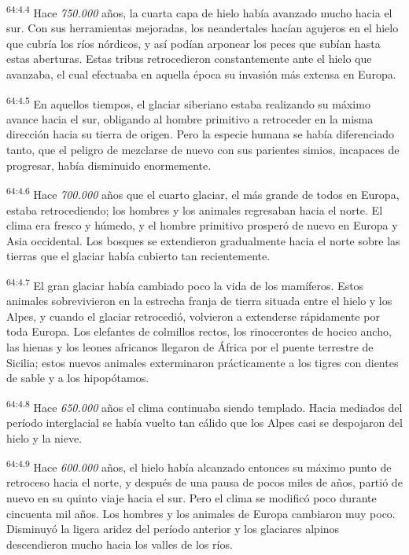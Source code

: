 \par
\textsuperscript{64:4.4} Hace \textit{750.000} años, la cuarta capa de hielo había avanzado mucho hacia el sur. Con sus herramientas mejoradas, los neandertales hacían agujeros en el hielo que cubría los ríos nórdicos, y así podían arponear los peces que subían hasta estas aberturas. Estas tribus retrocedieron constantemente ante el hielo que avanzaba, el cual efectuaba en aquella época su invasión más extensa en Europa.

\par
\textsuperscript{64:4.5} En aquellos tiempos, el glaciar siberiano estaba realizando su máximo avance hacia el sur, obligando al hombre primitivo a retroceder en la misma dirección hacia su tierra de origen. Pero la especie humana se había diferenciado tanto, que el peligro de mezclarse de nuevo con sus parientes simios, incapaces de progresar, había disminuido enormemente.

\par
\textsuperscript{64:4.6} Hace \textit{700.000} años que el cuarto glaciar, el más grande de todos en Europa, estaba retrocediendo; los hombres y los animales regresaban hacia el norte. El clima era fresco y húmedo, y el hombre primitivo prosperó de nuevo en Europa y Asia occidental. Los bosques se extendieron gradualmente hacia el norte sobre las tierras que el glaciar había cubierto tan recientemente.

\par
\textsuperscript{64:4.7} El gran glaciar había cambiado poco la vida de los mamíferos. Estos animales sobrevivieron en la estrecha franja de tierra situada entre el hielo y los Alpes, y cuando el glaciar retrocedió, volvieron a extenderse rápidamente por toda Europa. Los elefantes de colmillos rectos, los rinocerontes de hocico ancho, las hienas y los leones africanos llegaron de África por el puente terrestre de Sicilia; estos nuevos animales exterminaron prácticamente a los tigres con dientes de sable y a los hipopótamos.

\par
\textsuperscript{64:4.8} Hace \textit{650.000} años el clima continuaba siendo templado. Hacia mediados del período interglacial se había vuelto tan cálido que los Alpes casi se despojaron del hielo y la nieve.

\par
\textsuperscript{64:4.9} Hace \textit{600.000} años, el hielo había alcanzado entonces su máximo punto de retroceso hacia el norte, y después de una pausa de pocos miles de años, partió de nuevo en su quinto viaje hacia el sur. Pero el clima se modificó poco durante cincuenta mil años. Los hombres y los animales de Europa cambiaron muy poco. Disminuyó la ligera aridez del período anterior y los glaciares alpinos descendieron mucho hacia los valles de los ríos.

